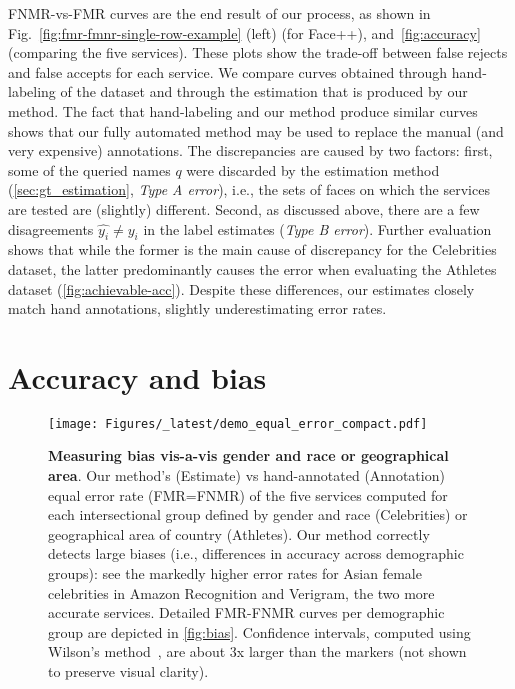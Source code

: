 \documentclass[10pt,twocolumn,letterpaper]{article}
\begin{document}
FNMR-vs-FMR curves are the end result of our process, as shown in Fig.~\ref{fig:fmr-fmnr-single-row-example} (left) (for Face++), and~\cref{fig:accuracy} (comparing the five services). These plots show the trade-off between false rejects and false accepts for each service. We compare curves obtained through hand-labeling of the dataset and through the estimation that is produced by our method. The fact that hand-labeling and our method produce similar curves shows that our fully automated method may be used to replace the manual (and very expensive) annotations. The discrepancies are caused by two factors: first, some of the queried names $q$ were discarded by the estimation method (\cref{sec:gt_estimation}, \textit{Type A error}), i.e., the sets of faces on which the services are tested are (slightly) different.  Second, as discussed above, there are a few disagreements $\hat{y_i} \neq y_i$ in the label estimates (\textit{Type B error}). Further evaluation shows that while the former is the main cause of discrepancy for the Celebrities dataset, the latter predominantly causes the error when evaluating the Athletes dataset (\cref{fig:achievable-acc}). Despite these differences, our estimates closely match hand annotations, slightly underestimating error rates.

\section{Accuracy and bias}
\label{sec:accuracy-and-bias}

\begin{figure*}[t!]
    \texttt{[image: Figures/\_latest/demo\_equal\_error\_compact.pdf]}
    \caption{\textbf{Measuring bias vis-a-vis gender and race or geographical area}. Our method's (Estimate) vs hand-annotated (Annotation) equal error rate (FMR=FNMR) of the five services computed for each intersectional group defined by gender and race (Celebrities) or geographical area of country (Athletes). Our method correctly detects large biases (i.e., differences in accuracy across demographic groups): see the markedly higher error rates for Asian female celebrities in Amazon Recognition and Verigram, the two more accurate services. Detailed FMR-FNMR curves per demographic group are depicted in \cref{fig:bias}. Confidence intervals, computed using Wilson's method~\cite{fogliato2024confidence}, are about 3x larger than the markers (not shown to preserve visual clarity).}
    \label{fig:bias-equal-error}
    \vspace{-3mm}
\end{figure*}
\end{document}
